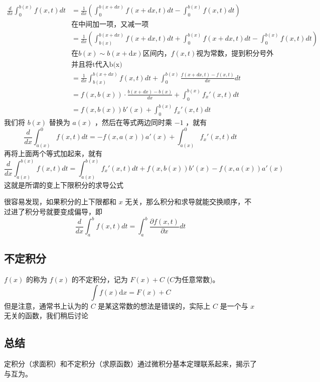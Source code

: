\documentclass[lang=cn,newtx,10pt,scheme=chinese]{elegantbook}
\renewcommand{\textbf}[1]{\text{\heiti #1}}
\begin{document}
\begin{align*}
\frac{d}{dx} \int_{0}^{b(x)} f(x,t) dt &= \frac{1}{dx} \left( \int_{0}^{b(x+dx)} f(x+dx, t) dt - \int_{0}^{b(x)} f(x,t) dt \right) \\
&\text{在中间加一项，又减一项}\\
&= \frac{1}{dx} \left( \int_{b(x)}^{b(x+dx)} f(x+dx, t) dt + \int_{0}^{b(x)} f(x+dx, t) dt - \int_{0}^{b(x)} f(x,t) dt \right) \\
&\text{在}b(x)\sim b(x+\mathrm{d}x) \text{区间内，} f(x,t) \text{视为常数，提到积分号外}\\
&\text{并且将t代入b(x)}\\
&= \frac{1}{dx} \int_{b(x)}^{b(x+dx)} f(x,t) dt + \int_{0}^{b(x)} \frac{f(x+dx, t) - f(x,t)}{dx} dt \\
&= f(x, b(x)) \cdot \frac{b(x+dx) - b(x)}{dx} + \int_{0}^{b(x)} f_x'(x,t) dt \\
&= f(x, b(x)) b'(x) + \int_{0}^{b(x)} f_x'(x,t) dt
\end{align*}
我们将 $b(x)$ 替换为 $a(x)$ ，然后在等式两边同时乘 $-1$ ，就有
\begin{equation}
  \frac{d}{dx} \int_{a(x)}^{0} f(x,t) dt=-f(x, a(x)) a'(x) + \int_{a(x)}^{0} f_x'(x,t) dt
\end{equation}
再将上面两个等式加起来，就有
\begin{equation}
  \frac{d}{dx} \int_{a(x)}^{b(x)} f(x,t) dt=\int_{a(x)}^{b(x)} f_x'(x,t) dt+f(x, b(x)) b'(x)-f(x, a(x)) a'(x)
\end{equation}
这就是所谓的变上下限积分的求导公式

很容易发现，如果积分的上下限都和 $x$ 无关，那么积分和求导就能交换顺序，不过进了积分号就要变成偏导，即
\begin{equation}
  \frac{d}{dx} \int_{a}^{b} f(x,t) dt=\int_{a}^{b} \frac{\partial f(x,t)}{\partial x} dt
\end{equation}

\subsection{不定积分}
$f(x)$ 的\textbf{全体原函数}称为 $f(x)$ 的不定积分，记为 $F(x) + C$ ($C$为任意常数)。
\begin{equation}
    \int f(x) \mathrm{d}x = F(x) + C
\end{equation}
但是注意，通常书上认为的 $C$ 是某这常数的想法是错误的，实际上 $C$ 是一个与 $x$ 无关的函数，我们稍后讨论

\subsection*{总结}
定积分（求面积）和不定积分（求原函数）通过微积分基本定理联系起来，揭示了\textbf{积分}与\textbf{求导}互为\textbf{逆运算}。
\end{document}
